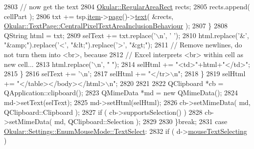 \begin{DoxyCode}
{{2803                         \textcolor{comment}{// now get the text}
2804                         \hyperlink{classOkular_1_1RegularAreaRect}{Okular::RegularAreaRect} rects;
2805                         rects.append( cellPart );
2806                         txt += tsp.\hyperlink{structTableSelectionPart_a400edc4e1ec30e28ff8159a741776e4b}{item}->\hyperlink{classPageViewItem_a5c512d95e5563e8d19d1fb3d93dafc31}{page}()->\hyperlink{classOkular_1_1Page_a11ab0f2abe5c1e760c046a33fd5393f3}{text}( &rects, 
      \hyperlink{classOkular_1_1TextPage_a07b135c84863f18df1d08e95aeeffd34a8f4ca9fdbb6e543cd335d787bc80eabc}{Okular::TextPage::CentralPixelTextAreaInclusionBehaviour}
       );
2807                     \}
2808                     QString html = txt;
2809                     selText += txt.replace(\textcolor{charliteral}{'\(\backslash\)n'}, \textcolor{charliteral}{' '});
2810                     html.replace(\textcolor{charliteral}{'&'}, \textcolor{stringliteral}{"&amp;"}).replace(\textcolor{charliteral}{'<'}, \textcolor{stringliteral}{"&lt;"}).replace(\textcolor{charliteral}{'>'}, \textcolor{stringliteral}{"&gt;"});
2811                     \textcolor{comment}{// Remove newlines, do not turn them into <br>, because}
2812                     \textcolor{comment}{// Excel interprets <br> within cell as new cell...}
2813                     html.replace(\textcolor{charliteral}{'\(\backslash\)n'}, \textcolor{stringliteral}{" "});
2814                     selHtml += \textcolor{stringliteral}{"<td>"}+html+\textcolor{stringliteral}{"</td>"};
2815                 \}
2816                 selText += \textcolor{charliteral}{'\(\backslash\)n'};
2817                 selHtml += \textcolor{stringliteral}{"</tr>\(\backslash\)n"};
2818             \}
2819             selHtml += \textcolor{stringliteral}{"</table></body></html>\(\backslash\)n"};
2820 
2821 
2822             QClipboard *cb = QApplication::clipboard();
2823             QMimeData *md = \textcolor{keyword}{new} QMimeData();
2824             md->setText(selText);
2825             md->setHtml(selHtml);
2826             cb->setMimeData( md, QClipboard::Clipboard );
2827             \textcolor{keywordflow}{if} ( cb->supportsSelection() )
2828                 cb->setMimeData( md, QClipboard::Selection );
2829 
2830         \}\textcolor{keywordflow}{break};
2831             \textcolor{keywordflow}{case} \hyperlink{classOkular_1_1Settings_1_1EnumMouseMode_ab2ae04e2d7d069f02195ccf32c52415bafafb47a3dab02c4016246ee80090e2d9}{Okular::Settings::EnumMouseMode::TextSelect}:
2832                 \textcolor{keywordflow}{if} ( d->\hyperlink{classPageViewPrivate_a64e9f3610cf2b731a3c0c4eae976e687}{mouseTextSelecting} )
}}
\end{DoxyCode}
